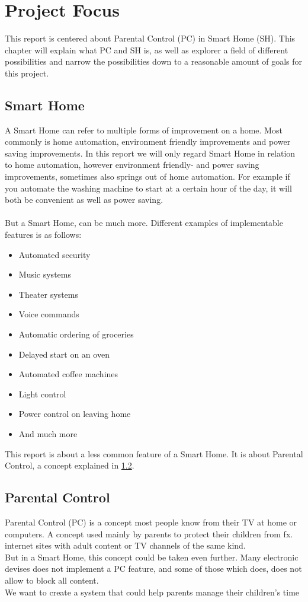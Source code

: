 \chapter{Project Focus}
This report is centered about Parental Control (PC) in Smart Home (SH). This chapter will explain what PC and SH is, as well as explorer a field of different possibilities and narrow the possibilities down to a reasonable amount of goals for this project.

\section{Smart Home}
A Smart Home can refer to multiple forms of improvement on a home. Most commonly is home automation, environment friendly improvements and power saving improvements. In this report we will only regard Smart Home in relation to home automation, however environment friendly- and power saving improvements, sometimes also springs out of home automation. For example if you automate the washing machine to start at a certain hour of the day, it will both be convenient as well as power saving.\\
\\
But a Smart Home, can be much more. Different examples of implementable features is as follows:

\begin{itemize}
	\item Automated security
	\item Music systems
	\item Theater systems
	\item Voice commands
	\item Automatic ordering of groceries
	\item Delayed start on an oven
	\item Automated coffee machines
	\item Light control
	\item Power control on leaving home
	\item And much more
\end{itemize}

This report is about a less common feature of a Smart Home. It is about Parental Control, a concept explained in \ref{parentalControl}.

\section{Parental Control}
\label{parentalControl}
Parental Control (PC) is a concept most people know from their TV at home or computers. A concept used mainly by parents to protect their children from fx. internet sites with adult content or TV channels of the same kind.\\
But in a Smart Home, this concept could be taken even further. Many electronic devises does not implement a PC feature, and some of those which does, does not allow to block all content.\\
We want to create a system that could help parents manage their children's time
